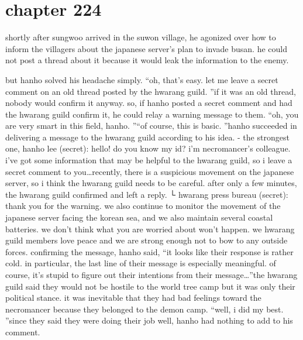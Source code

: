 \section{chapter 224}

                            shortly after sungwoo arrived in the suwon village, he agonized over how to inform the villagers about the japanese server’s plan to invade busan.
 he could not post a thread about it because it would leak the information to the enemy.





but hanho solved his headache simply.
“oh, that’s easy.
 let me leave a secret comment on an old thread posted by the hwarang guild.
”if it was an old thread, nobody would confirm it anyway.
 so, if hanho posted a secret comment and had the hwarang guild confirm it, he could relay a warning message to them.
“oh, you are very smart in this field, hanho.
”“of course, this is basic.
”hanho succeeded in delivering a message to the hwarang guild according to his idea.
- the strongest one, hanho lee (secret): hello! do you know my id? i’m necromancer’s colleague.
 i’ve got some information that may be helpful to the hwarang guild, so i leave a secret comment to you…recently, there is a suspicious movement on the japanese server, so i think the hwarang guild needs to be careful.
after only a few minutes, the hwarang guild confirmed and left a reply.
└ hwarang press bureau (secret): thank you for the warning.
 we also continue to monitor the movement of the japanese server facing the korean sea, and we also maintain several coastal batteries.
 we don’t think what you are worried about won’t happen.
 we hwarang guild members love peace and we are strong enough not to bow to any outside forces.
confirming the message, hanho said, “it looks like their response is rather cold.
 in particular, the last line of their message is especially meaningful.
 of course, it’s stupid to figure out their intentions from their message…”the hwarang guild said they would not be hostile to the world tree camp but it was only their political stance.
 it was inevitable that they had bad feelings toward the necromancer because they belonged to the demon camp.
“well, i did my best.
”since they said they were doing their job well, hanho had nothing to add to his comment.

